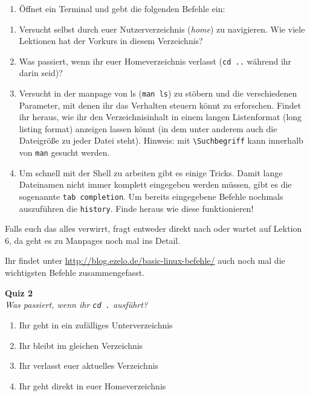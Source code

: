 \begin{praxis}
    \begin{enumerate}
        \item Öffnet ein Terminal und gebt die folgenden Befehle ein:
    \end{enumerate}
\end{praxis}

\begin{spiel}
    \begin{enumerate}
        \item Versucht selbst durch euer Nutzerverzeichnis (\emph{home}) zu navigieren.
              Wie viele Lektionen hat der Vorkurs in diesem Verzeichnis?
        \item Was passiert, wenn ihr euer Homeverzeichnis verlasst (\texttt{cd ..}
              während ihr darin seid)?
        \item Versucht in der manpage von ls (\texttt{man ls}) zu stöbern und die
              verschiedenen Parameter, mit denen ihr das Verhalten steuern könnt zu
              erforschen. Findet ihr heraus, wie ihr den Verzeichnisinhalt in einem
              langen Listenformat (long listing format) anzeigen lassen könnt (in dem
              unter anderem auch die Dateigröße zu jeder Datei steht). 
              Hinweis: mit \texttt{\textbackslash Suchbegriff} kann innerhalb von \texttt{man} gesucht werden.
        \item Um schnell mit der Shell zu arbeiten gibt es einige Tricks. 
        Damit lange Dateinamen nicht immer komplett eingegeben werden müssen, gibt es die sogenannte \texttt{tab completion}. 
        Um bereits eingegebene Befehle nochmals auszuführen die \texttt{history}. Finde heraus wie diese funktionieren!
    \end{enumerate}
  \end{spiel}


Falls euch das alles verwirrt, fragt entweder direkt nach oder wartet auf
Lektion 6, da geht es zu Manpages noch mal ins Detail.

Ihr findet unter \url{http://blog.ezelo.de/basic-linux-befehle/} auch noch mal
die wichtigsten Befehle zusammengefasst.

\textbf{Quiz 2}\\
\textit{Was passiert, wenn ihr \texttt{cd .} ausführt?}
\begin{enumerate}[label=\alph]
    \item Ihr geht in ein zufälliges Unterverzeichnis
    \item Ihr bleibt im gleichen Verzeichnis
    \item Ihr verlasst euer aktuelles Verzeichnis
    \item Ihr geht direkt in euer Homeverzeichnis
\end{enumerate}